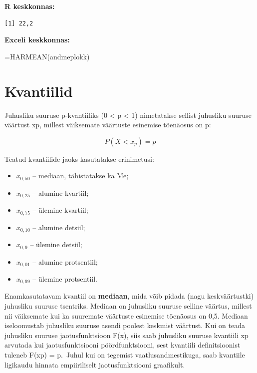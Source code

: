 \documentclass[
]{book}
\newenvironment{Shaded}{\begin{snugshade}}{\end{snugshade}}
\newcommand{\CommentTok}[1]{\textcolor[rgb]{0.56,0.35,0.01}{\textit{#1}}}
\newcommand{\DecValTok}[1]{\textcolor[rgb]{0.00,0.00,0.81}{#1}}
\newcommand{\FunctionTok}[1]{\textcolor[rgb]{0.13,0.29,0.53}{\textbf{#1}}}
\newcommand{\NormalTok}[1]{#1}
\newcommand{\SpecialCharTok}[1]{\textcolor[rgb]{0.81,0.36,0.00}{\textbf{#1}}}
\providecommand{\tightlist}{%
  \setlength{\itemsep}{0pt}\setlength{\parskip}{0pt}}
\renewenvironment{Shaded} {\begin{snugshade}\footnotesize} {\end{snugshade}}
\theoremstyle{definition}
\theoremstyle{definition}
\theoremstyle{definition}
\theoremstyle{definition}
\theoremstyle{remark}
\begin{document}
\textbf{R keskkonnas:}

\begin{Shaded}
\end{Shaded}

\begin{verbatim}
[1] 22,2
\end{verbatim}

\textbf{Exceli keskkonnas:}

\begin{naideExcel}
=HARMEAN(andmeplokk)

\end{naideExcel}

\section{Kvantiilid}\label{kvantiilid}

Juhusliku suuruse p-kvantiiliks (0 \textless{} p \textless{} 1) nimetatakse sellist juhusliku suuruse väärtust xp, millest väiksemate väärtuste esinemise tõenäosus on p:

\[ P (X < x_p) = p \]

Teatud kvantiilide jaoks kasutatakse erinimetusi:

\begin{itemize}
\tightlist
\item
  \(x_{0,50}\) -- mediaan, tähistatakse ka Me;
\item
  \(x_{0,25}\) -- alumine kvartiil;
\item
  \(x_{0,75}\) -- ülemine kvartiil;
\item
  \(x_{0,10}\) -- alumine detsiil;
\item
  \(x_{0,9}\) -- ülemine detsiil;
\item
  \(x_{0,01}\) -- alumine protsentiil;
\item
  \(x_{0,99}\) -- ülemine protsentiil.
\end{itemize}

Enamkasutatavam kvantiil on \textbf{mediaan}, mida võib pidada (nagu keskväärtustki) juhusliku suuruse tsentriks. Mediaan on juhusliku suuruse selline väärtus, millest nii väiksemate kui ka suuremate väärtuste esinemise tõenäosus on 0,5. Mediaan iseloomustab juhusliku suuruse asendi poolest keskmist väärtust.
Kui on teada juhusliku suuruse jaotusfunktsioon F(x), siis saab juhusliku suuruse kvantiili xp arvutada kui jaotusfunktsiooni pöördfunktsiooni, sest kvantiili definitsioonist tuleneb F(xp) = p.~Juhul kui on tegemist vaatlusandmestikuga, saab kvantiile ligikaudu hinnata empiiriliselt jaotusfunktsiooni graafikult.
\end{document}
